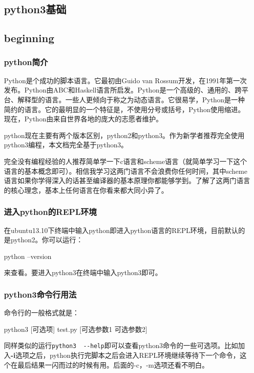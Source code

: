 \documentclass[12pt,oneside]{book}
\begin{document}
\begin{common-format}
\mainmatter

\part{python3基础}

\chapter{beginning}
\section{python简介}
Python是个成功的脚本语言。它最初由Guido van Rossum开发，在1991年第一次发布。Python由ABC和Haskell语言所启发。Python是一个高级的、通用的、跨平台、解释型的语言。一些人更倾向于称之为动态语言。它很易学，Python是一种简约的语言。它的最明显的一个特征是，不使用分号或括号，Python使用缩进。现在，Python由来自世界各地的庞大的志愿者维护。

python现在主要有两个版本区别，python2和python3。作为新学者推荐完全使用python3编程，本文档完全基于python3。

完全没有编程经验的人推荐简单学一下c语言和scheme语言（就简单学习一下这个语言的基本概念即可）。相信我学习这两门语言不会浪费你任何时间，其中scheme语言如果你学得深入的话甚至编译器的基本原理你都能够学到。了解了这两门语言的核心理念，基本上任何语言在你看来都大同小异了。

\section{进入python的REPL环境}
在ubuntu13.10下终端中输入python即进入python语言的REPL环境，目前默认的是python2。你可以运行：
\begin{tcbbash}[]
python  --version
\end{tcbbash}
来查看。要进入python3在终端中输入python3即可。


\section{python3命令行用法}
命令行的一般格式就是：
\begin{tcbbash}[]
python3  [可选项]  test.py  [可选参数1 可选参数2]
\end{tcbbash}

同样类似的运行\verb+python3  --help+即可以查看python3命令的一些可选项。比如加入\textbf{-i}选项之后，python执行完脚本之后会进入REPL环境继续等待下一个命令，这个在最后结果一闪而过的时候有用。后面的-c，-m选项还看不明白。


\end{common-format}
\end{document}
